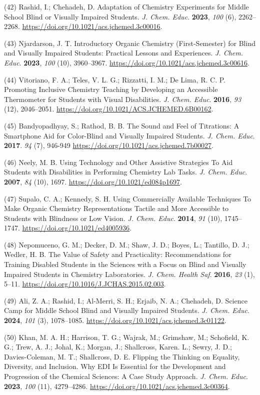 \documentclass[11.5pt]{sig-alternate} %
\begin{document}
(42)	Rashid, I.; Chehadeh, D. Adaptation of Chemistry Experiments for Middle School Blind or Visually Impaired Students. \textit{J. Chem. Educ}. \textbf{2023}, \textit{100} (6), 2262–2268. \url{https://doi.org/10.1021/acs.jchemed.3c00016}.

(43)	Njardarson, J. T. Introductory Organic Chemistry (First-Semester) for Blind and Visually Impaired Students: Practical Lessons and Experiences. \textit{J. Chem. Educ}. \textbf{2023}, \textit{100} (10), 3960–3967. \url{https://doi.org/10.1021/acs.jchemed.3c00616}.

(44)	Vitoriano, F. A.; Teles, V. L. G.; Rizzatti, I. M.; De Lima, R. C. P. Promoting Inclusive Chemistry Teaching by Developing an Accessible Thermometer for Students with Visual Disabilities. \textit{J. Chem. Educ}. \textbf{2016}, \textit{93} (12), 2046–2051. \url{https://doi.org/10.1021/ACS.JCHEMED.6B00162}.

(45)	Bandyopadhyay, S.; Rathod, B. B. The Sound and Feel of Titrations: A Smartphone Aid for Color-Blind and Visually Impaired Students.  \textit{J. Chem. Educ}. \textbf{2017}. \textit{94} (7), 946-949 \url{https://doi.org/10.1021/acs.jchemed.7b00027}.

(46)	Neely, M. B. Using Technology and Other Assistive Strategies To Aid Students with Disabilities in Performing Chemistry Lab Tasks. \textit{J. Chem. Educ}. \textbf{2007}, \textit{84} (10), 1697. \url{https://doi.org/10.1021/ed084p1697}.

(47)	Supalo, C. A.; Kennedy, S. H. Using Commercially Available Techniques To Make Organic Chemistry Representations Tactile and More Accessible to Students with Blindness or Low Vision. \textit{J. Chem. Educ}. \textbf{2014}, \textit{91} (10), 1745–1747. \url{https://doi.org/10.1021/ed4005936}.

(48)	Nepomuceno, G. M.; Decker, D. M.; Shaw, J. D.; Boyes, L.; Tantillo, D. J.; Wedler, H. B. The Value of Safety and Practicality: Recommendations for Training Disabled Students in the Sciences with a Focus on Blind and Visually Impaired Students in Chemistry Laboratories. \textit{J. Chem. Health Saf}. \textbf{2016}, \textit{23} (1), 5–11. \url{https://doi.org/10.1016/J.JCHAS.2015.02.003}.

(49)	Ali, Z. A.; Rashid, I.; Al-Merri, S. H.; Erjaib, N. A.; Chehadeh, D. Science Camp for Middle School Blind and Visually Impaired Students. \textit{J. Chem. Educ}. \textbf{2024}, \textit{101} (3), 1078–1085. \url{https://doi.org/10.1021/acs.jchemed.3c01122}.

(50)	Khan, M. A. H.; Harrison, T. G.; Wajrak, M.; Grimshaw, M.; Schofield, K. G.; Trew, A. J.; Johal, K.; Morgan, J.; Shallcross, Karen. L.; Sewry, J. D.; Davies-Coleman, M. T.; Shallcross, D. E. Flipping the Thinking on Equality, Diversity, and Inclusion. Why EDI Is Essential for the Development and Progression of the Chemical Sciences: A Case Study Approach. \textit{J. Chem. Educ}. \textbf{2023}, \textit{100} (11), 4279–4286. \url{https://doi.org/10.1021/acs.jchemed.3c00364}.
\end{document}
